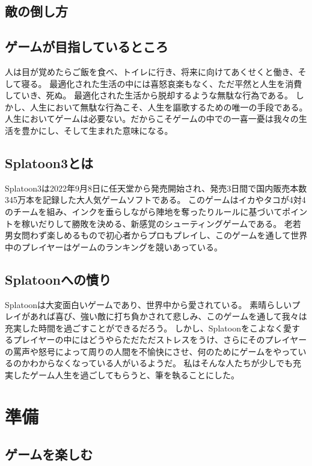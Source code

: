 \documentclass[a4paper,11pt]{jsbook}
\begin{document}
\section{敵の倒し方}



\section{ゲームが目指しているところ}
人は目が覚めたらご飯を食べ、トイレに行き、将来に向けてあくせくと働き、そして寝る。
最適化された生活の中には喜怒哀楽もなく、ただ平然と人生を消費していき、死ぬ。
最適化された生活から脱却するような無駄な行為である。
しかし、人生において無駄な行為こそ、人生を謳歌するための唯一の手段である。
人生においてゲームは必要ない。だからこそゲームの中での一喜一憂は我々の生活を豊かにし、そして生まれた意味になる。

\section{Splatoon3とは}
Splatoon3は2022年9月8日に任天堂から発売開始され、発売3日間で国内販売本数345万本を記録した大人気ゲームソフトである。
このゲームはイカやタコが4対4のチームを組み、インクを垂らしながら陣地を奪ったりルールに基づいてポイントを稼いだりして勝敗を決める、新感覚のシューティングゲームである。
老若男女問わず楽しめるもので初心者からプロもプレイし、このゲームを通して世界中のプレイヤーはゲームのランキングを競いあっている。

\section{Splatoonへの憤り}
Splatoonは大変面白いゲームであり、世界中から愛されている。
素晴らしいプレイがあれば喜び、強い敵に打ち負かされて悲しみ、このゲームを通して我々は充実した時間を過ごすことができるだろう。
しかし、Splatoonをこよなく愛するプレイヤーの中にはどうやらただただストレスをうけ、さらにそのプレイヤーの罵声や怒号によって周りの人間を不愉快にさせ、何のためにゲームをやっているのかわからなくなっている人がいるようだ。
私はそんな人たちが少しでも充実したゲーム人生を過ごしてもらうと、筆を執ることにした。

\chapter{準備}
\section{ゲームを楽しむ}
\end{document}
